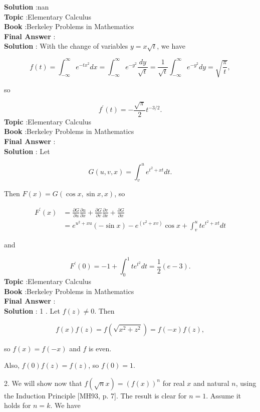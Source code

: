 \documentclass[10pt]{article}
\begin{document}
\textbf{Solution} :nan\\
\textbf{Topic} :Elementary Calculus \\
\textbf{Book} :Berkeley Problems in Mathematics\\
\textbf{Final Answer} :\\


\textbf{Solution} : With the change of variables $y=x \sqrt{t}$, we have

$$
f(t)=\int_{-\infty}^{\infty} e^{-t x^{2}} d x=\int_{-\infty}^{\infty} e^{-y^{2}} \frac{d y}{\sqrt{t}}=\frac{1}{\sqrt{t}} \int_{-\infty}^{\infty} e^{-y^{2}} d y=\sqrt{\frac{\pi}{t}},
$$

so

$$
f^{\prime}(t)=-\frac{\sqrt{\pi}}{2} t^{-3 / 2} .
$$
\textbf{Topic} :Elementary Calculus \\
\textbf{Book} :Berkeley Problems in Mathematics\\
\textbf{Final Answer} :\\


\textbf{Solution} : Let

$$
G(u, v, x)=\int_{v}^{u} e^{t^{2}+x t} d t .
$$

Then $F(x)=G(\cos x, \sin x, x)$, so

$$
\begin{aligned}
F^{\prime}(x) &=\frac{\partial G}{\partial u} \frac{\partial u}{\partial x}+\frac{\partial G}{\partial v} \frac{\partial v}{\partial x}+\frac{\partial G}{\partial x} \\
&=e^{u^{2}+x u}(-\sin x)-e^{\left(v^{2}+x v\right)} \cos x+\int_{v}^{u} t e^{t^{2}+x t} d t
\end{aligned}
$$

and

$$
F^{\prime}(0)=-1+\int_{0}^{1} t e^{t^{2}} d t=\frac{1}{2}(e-3) .
$$
\textbf{Topic} :Elementary Calculus \\
\textbf{Book} :Berkeley Problems in Mathematics\\
\textbf{Final Answer} :\\


\textbf{Solution} : 1 . Let $f(z) \neq 0$. Then

$$
f(x) f(z)=f\left(\sqrt{x^{2}+z^{2}}\right)=f(-x) f(z),
$$

so $f(x)=f(-x)$ and $f$ is even.

Also, $f(0) f(z)=f(z)$, so $f(0)=1$.

2. We will show now that $f(\sqrt{n} x)=(f(x))^{n}$ for real $x$ and natural $n$, using the Induction Principle [MH93, p. 7]. The result is clear for $n=1$. Assume it holds for $n=k$. We have
\end{document}

